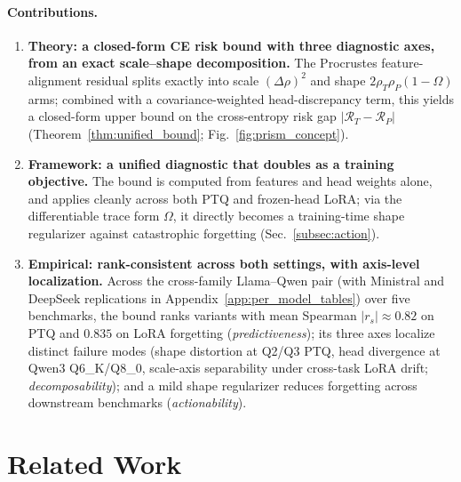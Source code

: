 \documentclass{article}
\begin{document}
\paragraph{Contributions.}
\begin{enumerate}[leftmargin=*,nosep,topsep=2pt]
    \item \textbf{Theory: a closed-form CE risk bound with three diagnostic axes, from an exact scale--shape decomposition.} The Procrustes feature-alignment residual splits exactly into scale $(\Delta\rho)^2$ and shape $2\rho_T\rho_P(1{-}\Omega)$ arms; combined with a covariance-weighted head-discrepancy term, this yields a closed-form upper bound on the cross-entropy risk gap $|\mathcal{R}_T - \mathcal{R}_P|$ (Theorem~\ref{thm:unified_bound}; Fig.~\ref{fig:prism_concept}).

    \item \textbf{Framework: a unified diagnostic that doubles as a training objective.} The bound is computed from features and head weights alone, and applies cleanly across both PTQ and frozen-head LoRA; via the differentiable trace form $\Omega$, it directly becomes a training-time shape regularizer against catastrophic forgetting (Sec.~\ref{subsec:action}).

    \item \textbf{Empirical: rank-consistent across both settings, with axis-level localization.} Across the cross-family Llama--Qwen pair (with Ministral and DeepSeek replications in Appendix~\ref{app:per_model_tables}) over five benchmarks, the bound ranks variants with mean Spearman $|r_s|{\approx}0.82$ on PTQ and $0.835$ on LoRA forgetting (\emph{predictiveness}); its three axes localize distinct failure modes (shape distortion at Q2/Q3 PTQ, head divergence at Qwen3 Q6\_K/Q8\_0, scale-axis separability under cross-task LoRA drift; \emph{decomposability}); and a mild shape regularizer reduces forgetting across downstream benchmarks (\emph{actionability}).
\end{enumerate}

\section{Related Work}
\end{document}
